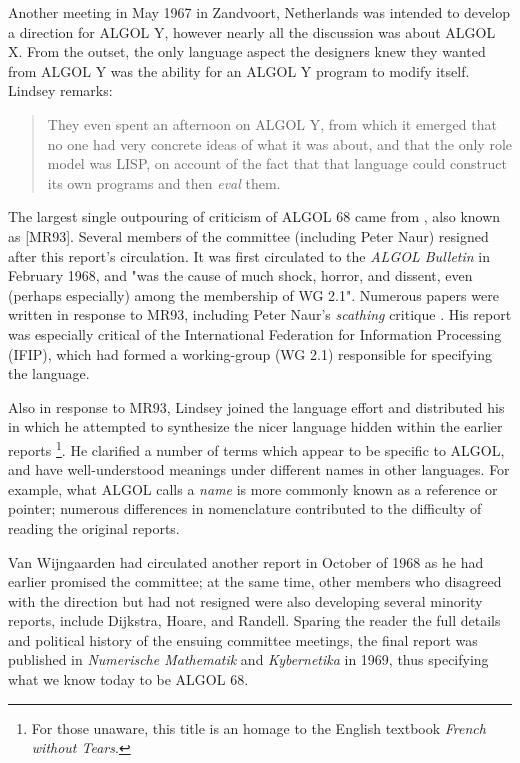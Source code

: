 Another meeting in May 1967 in Zandvoort, Netherlands was intended to develop a direction for ALGOL Y,
however nearly all the discussion was about ALGOL X.
From the outset, the only language aspect the designers knew they wanted from ALGOL Y
was the ability for an ALGOL Y program to modify itself.
Lindsey remarks:

\begin{quotation}
They even spent an afternoon on ALGOL Y, from which it emerged that no one had 
very concrete ideas of what it was about, and that the only role model was 
LISP, on account of the fact that that language could construct its own 
programs and then \textit{eval} them. 
\end{quotation}

The largest single outpouring of criticism of ALGOL 68 came from
, also known as [MR93].
Several members of the committee (including Peter Naur) resigned
after this report's circulation.
It was first circulated to the \textit{ALGOL Bulletin} in February 1968,
and "was the cause of much shock, horror, and dissent, even
(perhaps especially) among the membership of WG 2.1"\cite{a_history_of_algol_68_1993}.
Numerous papers were written in response to MR93, including Peter Naur's \textit{scathing}
critique .
His report was especially critical of the International Federation for Information Processing
(IFIP), which had formed a working-group (WG 2.1) responsible for specifying the language.

Also in response to MR93, Lindsey joined the language effort and
distributed his 
in which he attempted to synthesize the nicer language hidden within the earlier reports
\footnote{For those unaware, this title is an homage to the English textbook \textit{French without Tears}.}.
He clarified a number of terms which appear to be specific to ALGOL, and
have well-understood meanings under different names in other languages.
For example, what ALGOL calls a \textit{name} is more commonly known as a reference or pointer;
numerous differences in nomenclature contributed to the difficulty of reading
the original reports.

Van Wijngaarden had circulated another 
report\cite{penultimate_draft_report_on_algol_68_1968} in October of 1968 as he 
had earlier promised the committee; at the same time, other members who 
disagreed with the direction but had not resigned were also developing several 
minority reports, include Dijkstra, Hoare, and Randell.
Sparing the reader the full details and political history of the ensuing committee
meetings, the final report 
was published in \textit{Numerische Mathematik} and \textit{Kybernetika}
in 1969, thus specifying what we know today to be ALGOL 68.

